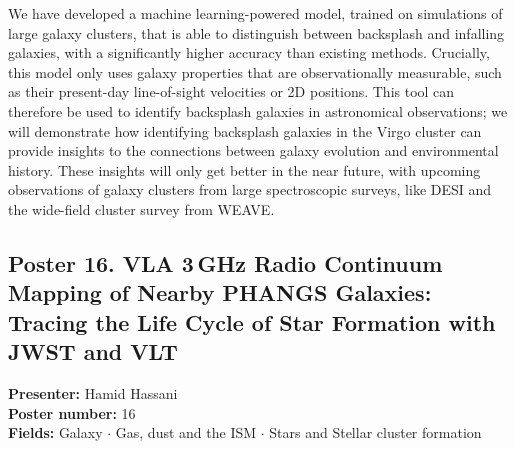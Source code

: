 We have developed a machine learning-powered model, trained on simulations of large galaxy clusters, that is able to distinguish between backsplash and infalling galaxies, with a significantly higher accuracy than existing methods. Crucially, this model only uses galaxy properties that are observationally measurable, such as their present-day line-of-sight velocities or 2D positions. This tool can therefore be used to identify backsplash galaxies in astronomical observations; we will demonstrate how identifying backsplash galaxies in the Virgo cluster can provide insights to the connections between galaxy evolution and environmental history. These insights will only get better in the near future, with upcoming observations of galaxy clusters from large spectroscopic surveys, like DESI and the wide-field cluster survey from WEAVE.

\hypertarget{poster-abstract-talk-252}{}\label{poster-abstract-page-talk-252}
\subsection*{Poster 16. VLA 3\,GHz Radio Continuum Mapping of Nearby PHANGS Galaxies: Tracing the Life Cycle of Star Formation with JWST and VLT}
\textbf{Presenter:} Hamid Hassani\\
\textbf{Poster number:} 16\\
\textbf{Fields:} Galaxy $\cdot$ Gas, dust and the ISM $\cdot$ Stars and Stellar cluster formation

